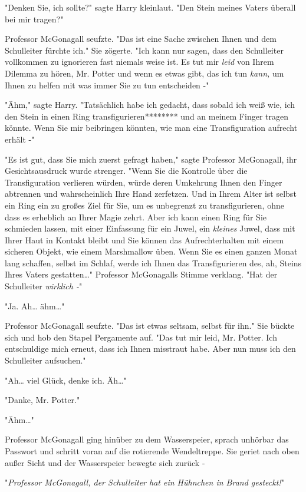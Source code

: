 {"Denken Sie, ich sollte?" sagte Harry kleinlaut. "Den Stein meines Vaters überall bei mir tragen?"

Professor McGonagall seufzte. "Das ist eine Sache zwischen Ihnen und dem Schulleiter fürchte ich." Sie zögerte. "Ich kann nur sagen, dass den Schulleiter vollkommen zu ignorieren fast niemals weise ist. Es tut mir \emph{leid} von Ihrem Dilemma zu hören, Mr. Potter und wenn es etwas gibt, das ich tun \emph{kann,} um Ihnen zu helfen mit was immer Sie zu tun entscheiden -"

"Ähm," sagte Harry. "Tatsächlich habe ich gedacht, dass sobald ich weiß wie, ich den Stein in einen Ring transfigurieren******** und an meinem Finger tragen könnte. Wenn Sie mir beibringen könnten, wie man eine Transfiguration aufrecht erhält -"

"Es ist gut, dass Sie mich zuerst gefragt haben," sagte Professor McGonagall, ihr Gesichtsausdruck wurde strenger. "Wenn Sie die Kontrolle über die Transfiguration verlieren würden, würde deren Umkehrung Ihnen den Finger abtrennen und wahrscheinlich Ihre Hand zerfetzen. Und in Ihrem Alter ist selbst ein Ring ein zu großes Ziel für Sie, um es unbegrenzt zu transfigurieren, ohne dass es erheblich an Ihrer Magie zehrt. Aber ich kann einen Ring für Sie schmieden lassen, mit einer Einfassung für ein Juwel, ein \emph{kleines} Juwel, dass mit Ihrer Haut in Kontakt bleibt und Sie können das Aufrechterhalten mit einem sicheren Objekt, wie einem Marshmallow üben. Wenn Sie es einen ganzen Monat lang schaffen, selbst im Schlaf, werde ich Ihnen das Transfigurieren des, ah, Steins Ihres Vaters gestatten…" Professor McGonagalls Stimme verklang. "Hat der Schulleiter \emph{wirklich -}"

"Ja. Ah… ähm…"

Professor McGonagall seufzte. "Das ist etwas seltsam, selbst für ihn." Sie bückte sich und hob den Stapel Pergamente auf. "Das tut mir leid, Mr. Potter. Ich entschuldige mich erneut, dass ich Ihnen misstraut habe. Aber nun muss ich den Schulleiter aufsuchen."

"Ah… viel Glück, denke ich. Äh…"

"Danke, Mr. Potter."

"Ähm…"

Professor McGonagall ging hinüber zu dem Wasserspeier, sprach unhörbar das Passwort und schritt voran auf die rotierende Wendeltreppe. Sie geriet nach oben außer Sicht und der Wasserspeier bewegte sich zurück -

"\emph{Professor McGonagall, der Schulleiter hat ein Hühnchen in Brand gesteckt!}"

}
